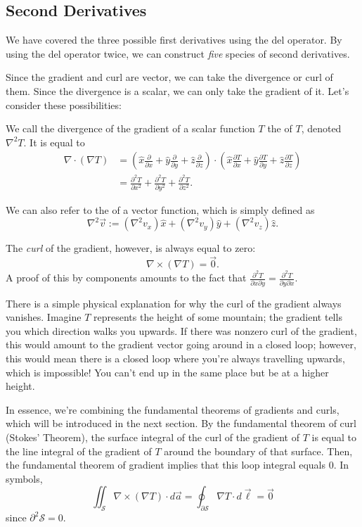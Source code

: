 \subsection{Second Derivatives}

We have covered the three possible first derivatives using the del operator. By using the del operator twice, we can construct \textit{five} species of second derivatives.

Since the gradient and curl are vector, we can take the divergence or curl of them. Since the divergence is a scalar, we can only take the gradient of it. Let's consider these possibilities:

\begin{definition}
    We call the divergence of the gradient of a scalar function $T$ the  of $T$, denoted $\nabla^2T$. It is equal to
    \begin{align*}
    \nabla\cdot(\nabla T)&=\left(\hat{x}\frac{\partial}{\partial x}+\hat{y}\frac{\partial}{\partial y}+\hat{z}\frac{\partial}{\partial z}\right)\cdot\left(\hat{x}\frac{\partial T}{\partial x}+\hat{y}\frac{\partial T}{\partial y}+\hat{z}\frac{\partial T}{\partial z}\right)\\
    &=\frac{\partial^2T}{\partial x^2}+\frac{\partial^2T}{\partial y^2}+\frac{\partial^2T}{\partial z^2}.
    \end{align*}
\end{definition}

\begin{definition}
    We can also refer to the  of a vector function, which is simply defined as
    \[\nabla^2\vec{v}:=(\nabla^2 v_x)\hat{x}+(\nabla^2 v_y)\hat{y}+(\nabla^2 v_z)\hat{z}.\]
\end{definition}
The \textit{curl} of the gradient, however, is always equal to zero:
\[\nabla\times(\nabla T)=\vec{0}.\]
A proof of this by components amounts to the fact that $\frac{\partial^2T}{\partial x\partial y}=\frac{\partial^2T}{\partial y\partial x}$.

\begin{remark}\label{remarkcurlgrad}
There is a simple physical explanation for why the curl of the gradient always vanishes. Imagine $T$ represents the height of some mountain; the gradient tells you which direction walks you upwards. If there was nonzero curl of the gradient, this would amount to the gradient vector going around in a closed loop; however, this would mean there is a closed loop where you're always travelling upwards, which is impossible! You can't end up in the same place but be at a higher height.

In essence, we're combining the fundamental theorems of gradients and curls, which will be introduced in the next section. By the fundamental theorem of curl (Stokes' Theorem), the surface integral of the curl of the gradient of $T$ is equal to the line integral of the gradient of $T$ around the boundary of that surface. Then, the fundamental theorem of gradient implies that this loop integral equals 0. In symbols,
\[\iint_\mathcal{S}\nabla\times(\nabla T)\cdot d\vec{a}=\oint_{\partial \mathcal{S}}\nabla T\cdot d\vec{\ell}=\vec{0}\]
since $\partial^2\mathcal{S}=0$.
\end{remark}

